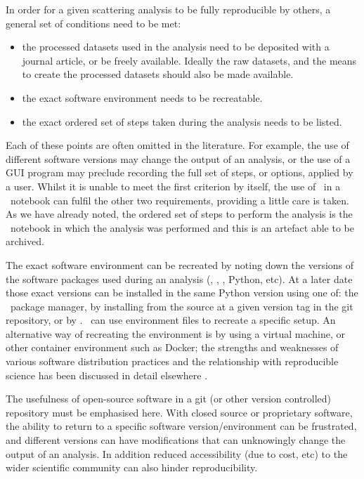\documentclass[pdf,preprint]{iucr}
\begin{document}
In order for a given scattering analysis to be fully reproducible by others, a general set of conditions need to be met:
\begin{itemize}
  \item the processed datasets used in the analysis need to be deposited with a journal article, or be freely available. Ideally the raw datasets, and the means to create the processed datasets should also be made available.
  \item the exact software environment needs to be recreatable.
  \item the exact ordered set of steps taken during the analysis needs to be listed.
\end{itemize} 
Each of these points are often omitted in the literature. For example, the use of different software versions may change the output of an analysis, or the use of a GUI program may preclude recording the full set of steps, or options, applied by a user. Whilst it is unable to meet the first criterion by itself, the use of \ in a \Jupyter\ notebook can fulfil the other two requirements, providing a little care is taken. As we have already noted, the ordered set of steps to perform the analysis is the \Jupyter\ notebook in which the analysis was performed and this is an artefact able to be archived.

The exact software environment can be recreated by noting down the versions of the software packages used during an analysis (, \SciPy, \NumPy, Python, etc). At a later date those exact versions can be installed in the same Python version using one of: the \conda\ package manager, by installing from the source at a given version tag in the git repository, or by \pip. \conda\ can use environment files to recreate a specific setup. An alternative way of recreating the environment is by using a virtual machine, or other container environment such as Docker; the strengths and weaknesses of various software distribution practices and the relationship with reproducible science has been discussed in detail elsewhere \cite{Moeller2017a}.

The usefulness of open-source software in a git (or other version controlled) repository must be emphasised here. With closed source or proprietary software, the ability to return to a specific software version/environment can be frustrated, and different versions can have modifications that can unknowingly change the output of an analysis. In addition reduced accessibility (due to cost, etc) to the wider scientific community can also hinder reproducibility.
\end{document}
